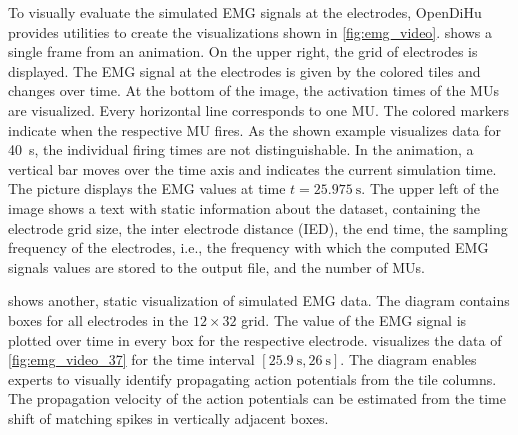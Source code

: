 To visually evaluate the simulated EMG signals at the electrodes, OpenDiHu provides utilities to create the visualizations shown in \cref{fig:emg_video}.  shows a single frame from an animation. On the upper right, the grid of electrodes is displayed. The EMG signal at the electrodes is given by the colored tiles and changes over time. At the bottom of the image, the activation times of the MUs are visualized. Every horizontal line corresponds to one MU. The colored markers indicate when the respective MU fires. As the shown example visualizes data for \SI{40}{\s}, the individual firing times are not distinguishable. In the animation, a vertical bar moves over the time axis and indicates the current simulation time. The picture displays the EMG values at time $t=\SI{25.975}{\s}$. The upper left of the image shows a text with static information about the dataset, containing the electrode grid size, the inter electrode distance (IED), the end time, the sampling frequency of the electrodes, i.e., the frequency with which the computed EMG signals values are stored to the output file, and the number of MUs.

 shows another, static visualization of simulated EMG data. The diagram contains boxes for all electrodes in the $12\times 32$ grid. The value of the EMG signal is plotted over time in every box for the respective electrode.  visualizes the data of \cref{fig:emg_video_37} for the time interval $[\SI{25.9}{\s},\SI{26}{\s}]$.
The diagram enables experts to visually identify propagating action potentials from the tile columns. The propagation velocity of the action potentials can be estimated from the time shift of matching spikes in vertically adjacent boxes.

